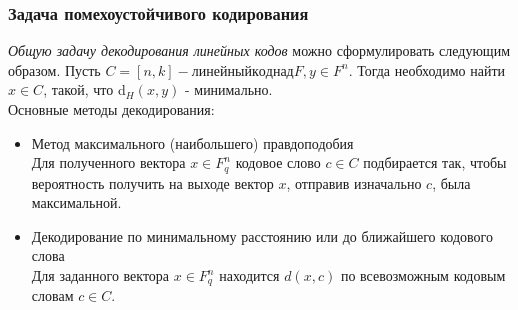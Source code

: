 \subsubsection{Задача помехоустойчивого кодирования}
\textit{Общую задачу декодирования линейных кодов} можно сформулировать следующим образом. Пусть $C = [n, k] - линейный код над F, y \in F^n$. Тогда необходимо найти $x \in C$, такой, что d$_H(x, y)$ - минимально.\\
Основные методы декодирования:
\begin{itemize}
    \item Метод максимального (наибольшего) правдоподобия\\
    Для полученного вектора $x \in F_q^n$ кодовое слово $c \in C$ подбирается так, чтобы вероятность получить на выходе вектор $x$, отправив изначально $c$, была максимальной.
    \item Декодирование по минимальному расстоянию или до ближайшего кодового слова\\
    Для заданного вектора $x \in F_q^n$ находится $d(x, c)$ по всевозможным кодовым словам $c \in C$. 
\end{itemize}

